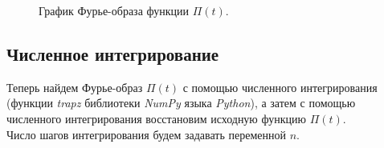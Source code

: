 \documentclass[a5paper, 10pt]{article}
\theoremstyle{definition}
\theoremstyle{plain}
\theoremstyle{remark}
\begin{document}
\begin{figure}[h!]
\caption{График Фурье-образа функции $\Pi(t)$.}
\end{figure}

\newpage
\subsection{Численное интегрирование}
Теперь найдем Фурье-образ $\Pi(t)$ с помощью численного интегрирования (функции \textit{trapz} библиотеки \textit{NumPy} языка \textit{Python}), а затем с помощью численного интегрирования восстановим исходную функцию $\Pi(t)$.\\

Число шагов интегрирования будем задавать переменной $n$.
\end{document}
